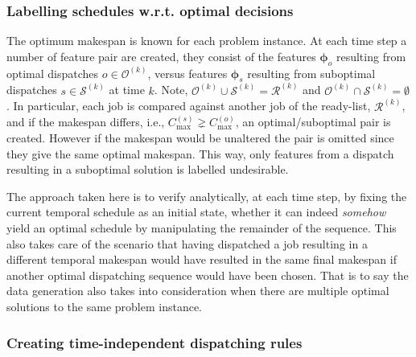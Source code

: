\documentclass[smallextended]{svjour3}
\renewcommand{\vphi}{\bm \phi}
\begin{document}
	\subsubsection{Labelling schedules w.r.t. optimal decisions}\label{sec:labelling}
	The optimum makespan is known for each problem instance. 
	At each time step a number of feature pair are created, they consist of the features $\vphi_o$ resulting from optimal dispatches $o\in\mathcal{O}^{(k)}$, versus features $\vphi_s$ resulting from suboptimal dispatches $s\in\mathcal{S}^{(k)}$ at time $k$. Note, $\mathcal{O}^{(k)}\cup\mathcal{S}^{(k)}=\mathcal{R}^{(k)}$ and $\mathcal{O}^{(k)}\cap\mathcal{S}^{(k)}=\emptyset$.
	In particular, each job is compared against another job of the ready-list, $\mathcal{R}^{(k)}$, and if the makespan differs, i.e., $C_{\max}^{(s)}\gneq C_{\max}^{(o)}$, an optimal/suboptimal pair is created. However if the makespan would be unaltered the pair is omitted since they give the same optimal makespan. This way, only features from a dispatch resulting in a suboptimal solution is labelled undesirable.
	
	The approach taken here is to verify analytically, at each time step, by fixing the current temporal schedule as an initial state, whether it can indeed \emph{somehow} yield an optimal schedule by manipulating the remainder of the sequence. This also takes care of the scenario that having dispatched a job resulting in a different temporal makespan would have resulted in the same final makespan if another optimal dispatching sequence would have been chosen. That is to say the data generation also takes into consideration when there are multiple optimal solutions to the same problem instance. 
	
	\subsubsection{Creating time-independent dispatching rules}\label{sec:ord:timeindependent}
	
\end{document}
